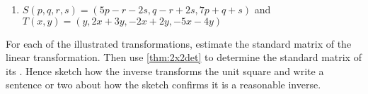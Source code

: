 \begin{exercise}
\begin{enumerate}
\item \(S(p,q,r,s)=(5p-r-2s, q-r+2s, 7p+q+s)\) and \(T(x,y)=(y, 2x+3y, -2x+2y, -5x-4y)\)

\end{enumerate}
\end{exercise}






\begin{exercise} \label{ex:} 
For each of the illustrated transformations, estimate the standard matrix of the linear transformation. 
Then use \autoref{thm:2x2det} to determine the standard matrix of its .
Hence sketch how the inverse transforms the unit square and write a sentence or two about how the sketch confirms it is a reasonable inverse. 
\begin{parts}
\item {}
\item {}
\item {}
\item {}
\item {}
\end{parts}
\end{exercise}





